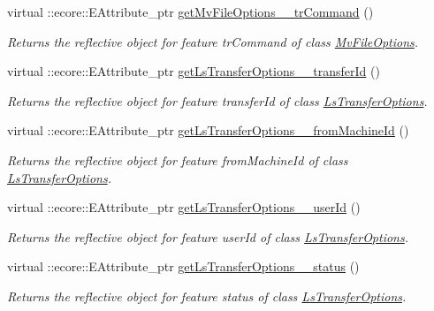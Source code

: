 \begin{DoxyCompactItemize}
virtual ::ecore::EAttribute\_\-ptr \hyperlink{classFMS__Data_1_1FMS__DataPackage_a1bb1b6c1b583642c767fc439a1f90844}{getMvFileOptions\_\-\_\-trCommand} ()
\begin{DoxyCompactList}\small\item\em Returns the reflective object for feature trCommand of class \hyperlink{classFMS__Data_1_1MvFileOptions}{MvFileOptions}. \item\end{DoxyCompactList}\item 
virtual ::ecore::EAttribute\_\-ptr \hyperlink{classFMS__Data_1_1FMS__DataPackage_a7afe564a94d139bd71b17e05bef47de3}{getLsTransferOptions\_\-\_\-transferId} ()
\begin{DoxyCompactList}\small\item\em Returns the reflective object for feature transferId of class \hyperlink{classFMS__Data_1_1LsTransferOptions}{LsTransferOptions}. \item\end{DoxyCompactList}\item 
virtual ::ecore::EAttribute\_\-ptr \hyperlink{classFMS__Data_1_1FMS__DataPackage_a23cb98885799f9b92d59be98cbb82574}{getLsTransferOptions\_\-\_\-fromMachineId} ()
\begin{DoxyCompactList}\small\item\em Returns the reflective object for feature fromMachineId of class \hyperlink{classFMS__Data_1_1LsTransferOptions}{LsTransferOptions}. \item\end{DoxyCompactList}\item 
virtual ::ecore::EAttribute\_\-ptr \hyperlink{classFMS__Data_1_1FMS__DataPackage_ae75036eec2138bbdbe03b7e3fe58d5ca}{getLsTransferOptions\_\-\_\-userId} ()
\begin{DoxyCompactList}\small\item\em Returns the reflective object for feature userId of class \hyperlink{classFMS__Data_1_1LsTransferOptions}{LsTransferOptions}. \item\end{DoxyCompactList}\item 
virtual ::ecore::EAttribute\_\-ptr \hyperlink{classFMS__Data_1_1FMS__DataPackage_a2a54b81b06caf3faeb1bd26fc8931995}{getLsTransferOptions\_\-\_\-status} ()
\begin{DoxyCompactList}\small\item\em Returns the reflective object for feature status of class \hyperlink{classFMS__Data_1_1LsTransferOptions}{LsTransferOptions}. \item\end{DoxyCompactList}\item 

\end{DoxyCompactItemize}

